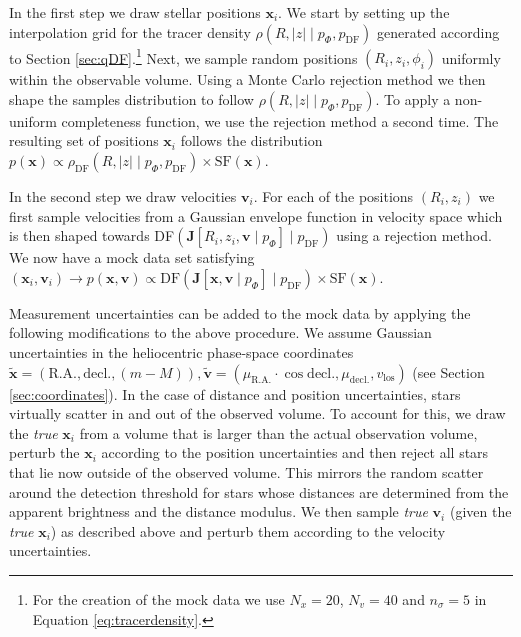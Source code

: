 \documentclass[iop,revtex4,numberedappendix,appendixfloats]{emulateapj}
\newcommand{\vect}[1]{\boldsymbol{#1}}
\begin{document}
In the first step we draw stellar positions $\vect{x}_i$. We start by setting up the interpolation grid for the tracer density $\rho(R,|z| \mid p_\Phi, p_\text{DF})$ generated according to Section \ref{sec:qDF}.\footnote{For the creation of the mock data we use $N_x = 20$, $N_v = 40$ and $n_\sigma=5$ in Equation \eqref{eq:tracerdensity}.} Next, we sample random positions $(R_i,z_i,\phi_i)$ uniformly within the observable volume. Using a Monte Carlo rejection method we then shape the samples distribution to follow $\rho(R,|z| \mid p_\Phi, p_\text{DF})$. To apply a non-uniform completeness function, we use the rejection method a second time. The resulting set of positions $\vect{x}_i$ follows the distribution $p(\vect{x}) \propto \rho_\text{DF}(R,|z| \mid p_{\Phi},p_\text{DF}) \times \text{SF}(\vect{x})$.

In the second step we draw velocities $\vect{v}_i$. For each of the positions $(R_i,z_i)$ we first sample velocities from a Gaussian envelope function in velocity space which is then shaped towards DF$(\vect{J}[R_i,z_i,\vect{v} \mid p_{\Phi}] \mid p_\text{DF})$ using a rejection method. We now have a mock data set satisfying $(\vect{x}_i,\vect{v}_i) \longrightarrow p(\vect{x},\vect{v}) \propto \text{DF}(\vect{J}[\vect{x},\vect{v} \mid p_{\Phi}] \mid p_\text{DF}) \times \text{SF}(\vect{x})$.

Measurement uncertainties can be added to the mock data by applying the following modifications to the above procedure. We assume Gaussian uncertainties in the heliocentric phase-space coordinates $\tilde{\vect{x}} = (\text{R.A.},\text{decl.},(m-M)), \tilde{\vect{v}} = (\mu_\text{R.A.} \cdot \cos \text{decl.} ,\mu_\text{decl.},v_\text{los})$ (see Section \ref{sec:coordinates}). In the case of distance and position uncertainties, stars virtually scatter in and out of the observed volume. To account for this, we draw the \emph{true} $\vect{x}_i$ from a volume that is larger than the actual observation volume, perturb the $\vect{x}_i$ according to the position uncertainties and then reject all stars that lie now outside of the observed volume. This mirrors the random scatter around the detection threshold for stars whose distances are determined from the apparent brightness and the distance modulus. We then sample \emph{true} $\vect{v}_i$ (given the \emph{true} $\vect{x}_i$) as described above and perturb them according to the velocity uncertainties.
\end{document}
